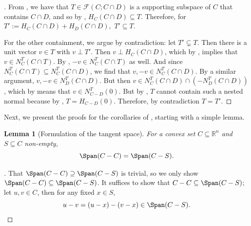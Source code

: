 \documentclass{article}
\theoremstyle{plain}
\newtheorem{lemma}{Lemma}[section]
\theoremstyle{definition}
\theoremstyle{remark}
\begin{document}
\begin{proof}[\hypertarget{loc:characterization_through_generated_faces.proof}Proof of \Cref{loc:characterization_through_generated_faces.statement}]

From , we have that
$T \in \mathcal{F}(C; C \cap D)$ is a supporting subspace of $C$ that contains $C  \cap D$,
and so by ,
$H_C(C \cap D) \subseteq T$. Therefore,
for $T':= H_C(C \cap D) + H_D(C \cap D),$ $T' \subseteq T.$

For the other containment, we argue by contradiction: let $T' \subsetneq T$. Then there is a unit vector $v \in T$
with $v \perp T'$. Then $v \perp H_C(C  \cap D)$, which by
,
implies that $v \in N_C^T(C \cap T)$. By ,
 $-v \in N_C^T(C \cap T)$ as well.
And since $N_C^T(C \cap T) \subseteq N_C^T(C \cap D)$, we find that $v, -v \in N_C^T(C \cap D)$. 
By a similar argument, $v, -v \in N_D^T(C \cap D)$.
But then $v \in N_C^T(C \cap D)  \cap (-N_D^T(C \cap D))$, which by  means that $v \in N_{C-D}^T(0)$.
But by , $T$ cannot contain such a nested normal because by , $T=H_{C-D}(0)$. Therefore, by contradiction $T=T'$.
\end{proof}
Next, we present the proofs for the corollaries of 
, starting with a simple lemma.
\begin{lemma}[Formulation of the tangent space]
\label{loc:formulation_of_the_tangent_space.statement}
For a convex set $C \subseteq \mathbb{R}^n$ and $S \subseteq C$ non-empty,
\begin{equation*}
\Span(C-C) = \Span(C-S).
\end{equation*}
\end{lemma}
\begin{proof}[\hypertarget{loc:formulation_of_the_tangent_space.proof}Proof of \Cref{loc:formulation_of_the_tangent_space.statement}]

That $\Span(C-C) \supseteq \Span(C-S)$ is trivial, so
we only show $\Span(C-C) \subseteq \Span(C-S)$.
It suffices to show that $C-C \subseteq \Span(C-S)$;
let $u, v \in C$, then for any fixed $x \in S$,
\begin{equation*}
u-v = (u-x)-(v-x) \in \Span(C-S).
\end{equation*}
\end{proof}
\end{document}
